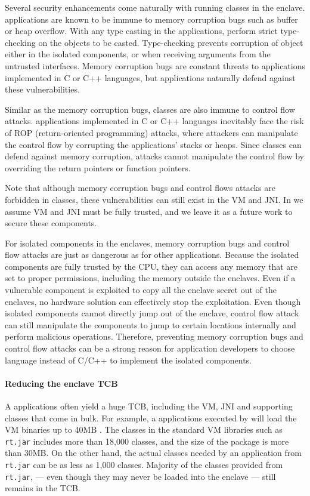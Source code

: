 Several security enhancements come naturally with running \java{} classes
in the enclave. \java{} applications are known to be immune to memory corruption bugs such as buffer or heap overflow.
With any type casting in the \java{} applications, \java{} perform strict type-checking on the objects to be casted.
Type-checking prevents corruption of object either in the isolated components,
or when receiving arguments from the untrusted interfaces.
Memory corruption bugs are constant threats to applications
implemented in C or C++ languages,
but \java{} applications naturally defend against these vulnerabilities.

Similar as the memory corruption bugs,
\java{} classes are also immune to control flow attacks.
applications implemented in C or C++ languages inevitably face the risk of ROP (return-oriented programming) attacks,
where attackers can manipulate the control flow by corrupting the applications' stacks or heaps.
Since \java{} classes can defend against memory corruption,
attacks cannot manipulate the control flow by overriding the return pointers or function pointers.

Note that although memory corruption bugs and control flows attacks are forbidden in \java{} classes,
these vulnerabilities can still exist in the \java{} VM and JNI.
In \sysname{} we assume \java{} VM and JNI must be fully trusted,
and we leave it as a future work to secure these components.

For isolated components in the enclaves, memory corruption bugs and control flow attacks are just as dangerous as for other applications.
Because the isolated components are fully trusted by the CPU,
they can access any memory that are set to proper permissions, including the memory outside the enclaves.
Even if a vulnerable component is exploited to copy all the enclave secret out of the enclaves, no hardware solution can effectively stop the exploitation.
Even though isolated components cannot directly jump out of the enclave,
control flow attack can still manipulate the components to jump to certain locations internally and perform malicious operations. 
Therefore, preventing memory corruption bugs and control flow attacks
can be a strong reason for application developers
to choose \java{} language instead of C/C++ to implement the isolated components.

\paragraph{Reducing the enclave TCB}
A \java{} applications often yield a huge TCB, including the \java{} VM,
JNI and supporting classes that come in bulk.
For example, a \java{} applications executed by \jvmname{}
will load the \java{} VM binaries up to 40MB . The classes in the standard \java{} VM libraries such as {\tt rt.jar} includes more than 18,000 classes, and the size of the package is more than 30MB.
On the other hand, the actual classes needed by an application from {\tt rt.jar}
can be as less as 1,000 classes.
Majority of the classes provided from {\tt rt.jar},
--- even though they may never be loaded into the enclave ---
still remains in the TCB.


